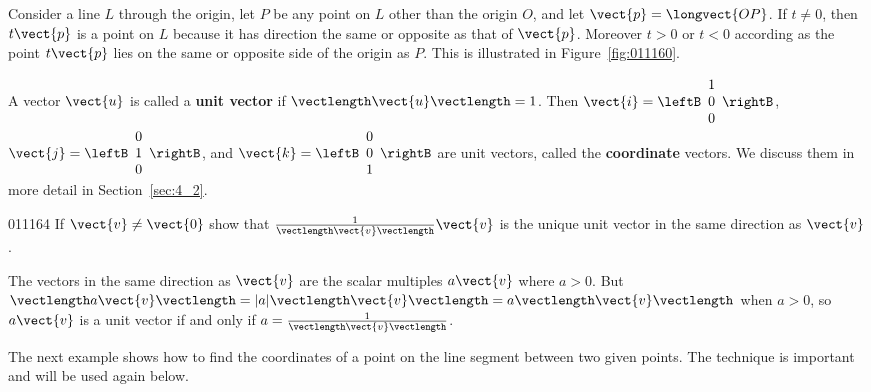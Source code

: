 Consider a line $L$ through the origin, let $P$ be any point on $L$ other than the origin $O$, and let $\vect{p} = \longvect{OP}$. If $t \neq 0$, then $t\vect{p}$ is a point on $L$ because it has direction the same or opposite as that of $\vect{p}$. Moreover $t > 0$ or $t < 0$ according as the point $t\vect{p}$ lies on the same or opposite side of the origin as $P$. This is illustrated in Figure~\ref{fig:011160}.

A vector $\vect{u}$ is called a \textbf{unit vector} if $\vectlength \vect{u} \vectlength = 1$. Then 
$\vect{i} = \leftB
\begin{array}{c}
1 \\
0 \\
0  
\end{array}
\rightB$, 
\\ $\vect{j} = \leftB
\begin{array}{c}
0 \\
1 \\
0  
\end{array}
\rightB$, and 
$\vect{k} = \leftB
\begin{array}{c}
0 \\
0 \\
1  
\end{array}
\rightB$ 
are unit vectors, called the \textbf{coordinate} vectors. We discuss them in more detail in Section~\ref{sec:4_2}.

\vspace{2em}
\begin{example}{}{011164}
If $\vect{v} \neq \vect{0}$ show that $\frac{1}{\vectlength \vect{v} \vectlength} \vect{v}$ is the unique unit vector in the same direction as $\vect{v}$.


\begin{solution}
  The vectors in the same direction as $\vect{v}$ are the scalar multiples $a\vect{v}$ where $a > 0$. But $\vectlength a\vect{v} \vectlength = |a| \vectlength \vect{v} \vectlength = a \vectlength \vect{v} \vectlength$ when $a > 0$, so $a\vect{v}$ is a unit vector if and only if $a = \frac{1}{\vectlength \vect{v} \vectlength}$.
\end{solution}
\end{example}

The
 next example shows how to find the coordinates of a point on the line 
segment between two given points. The technique is important and will be
 used again below.

